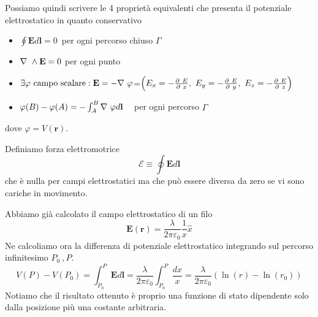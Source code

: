 \documentclass[
10pt, %
a4paper, %
oneside, %
headinclude,footinclude, %
BCOR5mm, %
]{scrartcl}
\begin{document}
Possiamo quindi scrivere le 4 proprietà equivalenti che presenta il potenziale elettrostatico in quanto conservativo
\begin{itemize}
	\item \(\oint \mathbf{E}d\mathbf{l} = 0 \)\ per ogni percorso chiuso $\Gamma$ 
	\item \(\mathbf{\nabla\ }\wedge\mathbf{E} = 0\) per ogni punto
	\item \(\exists\varphi\  \text{campo scalare} : \mathbf{E}=-\mathbf{\nabla\ }\varphi\)=$\left(E_x = -\frac{\partial\  E}{\partial\  x},\ E_y= - \frac{\partial\  E}{\partial\  y},\ E_z= -\frac{\partial\  E}{\partial\  z}\right)$
	\item \(\varphi(B)-\varphi(A) = -\int_{A}^{B}\mathbf{\nabla\ }\varphi d\mathbf{l}\ \) \ per ogni percorso $\Gamma$ 
\end{itemize}
dove $\varphi = V(\mathbf{r})$.
\begin{definizione}
Definiamo forza elettromotrice
\[\mathcal{E} \equiv \oint \mathbf{E}d\mathbf{l}\]
che è nulla per campi elettrostatici ma che può essere diversa da zero se vi sono cariche in movimento.
\end{definizione}
\begin{esercizio}
Abbiamo già calcolato il campo elettrostatico di un filo
\[\mathbf{E}(\mathbf{r}) = \frac{\lambda}{2\pi\varepsilon_0}\frac{1}{x}\hat{x}\]
Ne calcoliamo ora la differenza di potenziale elettrostatico integrando sul percorso infinitesimo \(P_0\ , P\). 
\[V(P)-V(P_0) = \int_{P_0}^{P}\mathbf{E}d\mathbf{l} = \frac{\lambda}{2\pi\varepsilon_0} \int_{P_0}^{P}\frac{dx}{x}= \frac{\lambda}{2\pi\varepsilon_0} \left(\ln(r)-\ln(r_0)\right)\]
Notiamo che il risultato ottenuto è proprio una funzione di stato dipendente solo dalla posizione più una costante arbitraria.  
\end{esercizio}
\end{document}
